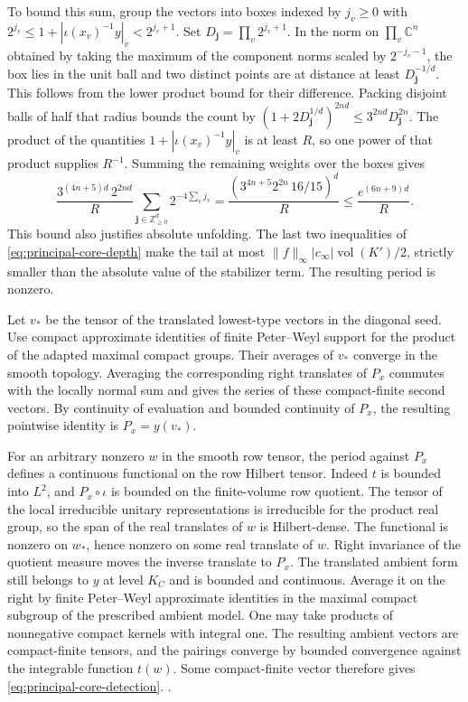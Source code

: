 To bound this sum, group the vectors into boxes indexed by
\(j_v\ge0\) with \(2^{j_v}\le1+|\iota(x_v)^{-1}y|_v
<2^{j_v+1}\). Set \(D_{\mathbf j}=\prod_v2^{j_v+1}\).
In the norm on \(\prod_v\mathbb C^n\) obtained by taking the
maximum of the component norms scaled by \(2^{-j_v-1}\), the
box lies in the unit ball and two distinct points are at
distance at least \(D_{\mathbf j}^{-1/d}\). This follows from
the lower product bound for their difference. Packing disjoint
balls of half that radius bounds the count by
\((1+2D_{\mathbf j}^{1/d})^{2nd}\le
3^{2nd}D_{\mathbf j}^{2n}\).
The product of the quantities \(1+|\iota(x_v)^{-1}y|_v\)
is at least \(R\), so one power of that product supplies \(R^{-1}\).
Summing the remaining weights over the boxes gives
\[
 \frac{3^{(4n+5)d}\,2^{2nd}}{R}
     \sum_{\mathbf j\in\mathbb Z_{\ge0}^{d}}2^{-4\sum_v j_v}
 =\frac{(3^{4n+5}2^{2n}\,16/15)^d}{R}
 \le\frac{e^{(6n+9)d}}{R}.
\]
This bound also justifies absolute unfolding. The last two
inequalities of \eqref{eq:principal-core-depth} make the tail
at most \(\|f\|_\infty|c_\infty|\operatorname{vol}(K')/2\),
strictly smaller than the absolute value of the stabilizer term.
The resulting period is nonzero.

Let \(v_*\) be the tensor of the translated lowest-type vectors
in the diagonal seed. Use compact approximate identities of
finite Peter--Weyl support for the product of the adapted
maximal compact groups. Their averages of \(v_*\) converge in
the smooth topology. Averaging the corresponding right
translates of \(P_x\) commutes with the locally normal sum
and gives the series of these compact-finite second vectors.
By continuity of evaluation and bounded continuity of \(P_x\),
the resulting pointwise identity is \(P_x=y(v_*)\).

For an arbitrary nonzero \(w\) in the smooth row tensor, the
period against \(P_x\) defines a continuous functional on the
row Hilbert tensor. Indeed \(t\) is bounded into \(L^2\), and
\(P_x\circ\iota\) is bounded on the finite-volume row quotient.
The tensor of the local irreducible unitary representations
is irreducible for the product real group, so the span of the
real translates of \(w\) is Hilbert-dense. The functional is
nonzero on \(w_*\), hence nonzero on some real translate of
\(w\). Right invariance of the quotient measure moves the
inverse translate to \(P_x\). The translated ambient form
still belongs to \(y\) at level \(K_C\) and is bounded and
continuous. Average it on the right by finite Peter--Weyl
approximate identities in the maximal compact subgroup of
the prescribed ambient model. One may take products of
nonnegative compact kernels with integral one. The resulting
ambient vectors are compact-finite tensors, and the pairings
converge by bounded convergence against the integrable
function \(t(w)\). Some compact-finite vector therefore gives
\eqref{eq:principal-core-detection}.
.

